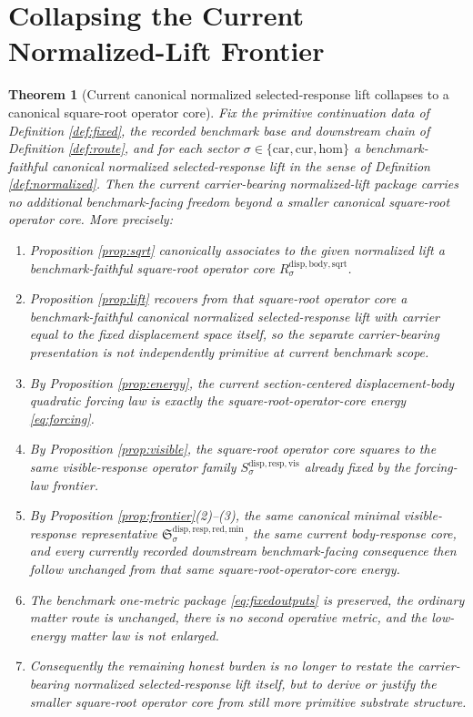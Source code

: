 \documentclass[11pt]{article}
\newcommand{\Car}{\mathrm{car}}
\newcommand{\Cur}{\mathrm{cur}}
\newcommand{\Hom}{\mathrm{hom}}
\newcommand{\VisibleResponseOperator}[1]{S_{#1}^{\mathrm{disp,resp,vis}}}
\newcommand{\MinimalReducedStructure}{\mathfrak S^{\mathrm{disp,resp,red,min}}}
\newcommand{\SquareRootOperator}[1]{R_{#1}^{\mathrm{disp,body,sqrt}}}
\newtheorem{theorem}{Theorem}
\begin{document}
\section{Collapsing the Current Normalized-Lift Frontier}

\begin{theorem}[Current canonical normalized selected-response lift collapses to a canonical square-root operator core]
\label{thm:main}
Fix the primitive continuation data of Definition \ref{def:fixed}, the recorded benchmark base and downstream chain of Definition \ref{def:route}, and for each sector \(\sigma\in\{\Car,\Cur,\Hom\}\) a benchmark-faithful canonical normalized selected-response lift in the sense of Definition \ref{def:normalized}. Then the current carrier-bearing normalized-lift package carries no additional benchmark-facing freedom beyond a smaller canonical square-root operator core. More precisely:
\begin{enumerate}
    \item Proposition \ref{prop:sqrt} canonically associates to the given normalized lift a benchmark-faithful square-root operator core \(\SquareRootOperator{\sigma}\).
    \item Proposition \ref{prop:lift} recovers from that square-root operator core a benchmark-faithful canonical normalized selected-response lift with carrier equal to the fixed displacement space itself, so the separate carrier-bearing presentation is not independently primitive at current benchmark scope.
    \item By Proposition \ref{prop:energy}, the current section-centered displacement-body quadratic forcing law is exactly the square-root-operator-core energy \eqref{eq:forcing}.
    \item By Proposition \ref{prop:visible}, the square-root operator core squares to the same visible-response operator family \(\VisibleResponseOperator{\sigma}\) already fixed by the forcing-law frontier.
    \item By Proposition \ref{prop:frontier}(2)--(3), the same canonical minimal visible-response representative \(\MinimalReducedStructure_{\sigma}\), the same current body-response core, and every currently recorded downstream benchmark-facing consequence then follow unchanged from that same square-root-operator-core energy.
    \item The benchmark one-metric package \eqref{eq:fixedoutputs} is preserved, the ordinary matter route is unchanged, there is no second operative metric, and the low-energy matter law is not enlarged.
    \item Consequently the remaining honest burden is no longer to restate the carrier-bearing normalized selected-response lift itself, but to derive or justify the smaller square-root operator core from still more primitive substrate structure.
\end{enumerate}
\end{theorem}
\end{document}
